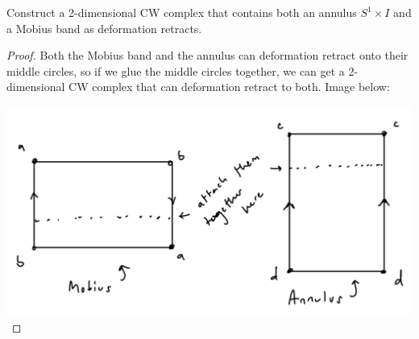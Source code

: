 \documentclass[12pt]{article}
\newenvironment{statement}[2][Statement]{\begin{trivlist}
\item[\hskip \labelsep {\bfseries #1}\hskip \labelsep {\bfseries #2.}]}{\end{trivlist}}
\begin{document}
\begin{statement}[Exercise]{0.17b}
    Construct a 2-dimensional CW complex that contains both an annulus $S^1 \times I$ and a Mobius band as deformation retracts. 
\end{statement}
\begin{proof}
    Both the Mobius band and the annulus can deformation retract onto their middle circles, so if we glue the middle circles together, we can get a 2-dimensional CW complex that can deformation retract to both. Image below:
    \par \includegraphics[scale=.3]{0.17b.png}
\end{proof}
\end{document}
